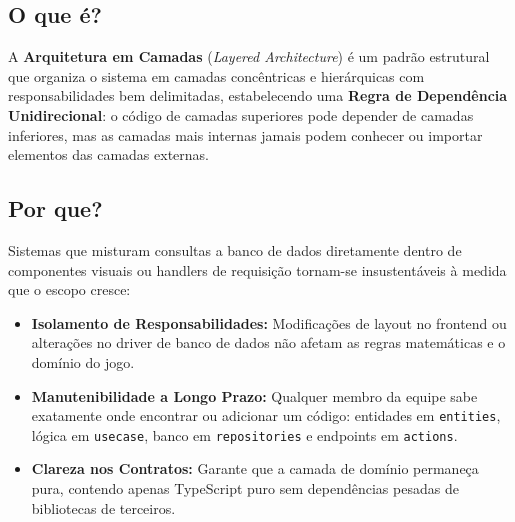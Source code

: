 \documentclass[12pt,a4paper]{article}
\begin{document}
\subsection{O que é?}
A \textbf{Arquitetura em Camadas} (\textit{Layered Architecture}) é um padrão estrutural que organiza o sistema em camadas concêntricas e hierárquicas com responsabilidades bem delimitadas, estabelecendo uma \textbf{Regra de Dependência Unidirecional}: o código de camadas superiores pode depender de camadas inferiores, mas as camadas mais internas jamais podem conhecer ou importar elementos das camadas externas.

\subsection{Por que?}
Sistemas que misturam consultas a banco de dados diretamente dentro de componentes visuais ou handlers de requisição tornam-se insustentáveis à medida que o escopo cresce:
\begin{itemize}
  \item \textbf{Isolamento de Responsabilidades:} Modificações de layout no frontend ou alterações no driver de banco de dados não afetam as regras matemáticas e o domínio do jogo.
  \item \textbf{Manutenibilidade a Longo Prazo:} Qualquer membro da equipe sabe exatamente onde encontrar ou adicionar um código: entidades em \texttt{entities}, lógica em \texttt{usecase}, banco em \texttt{repositories} e endpoints em \texttt{actions}.
  \item \textbf{Clareza nos Contratos:} Garante que a camada de domínio permaneça pura, contendo apenas TypeScript puro sem dependências pesadas de bibliotecas de terceiros.
\end{itemize}
\end{document}
